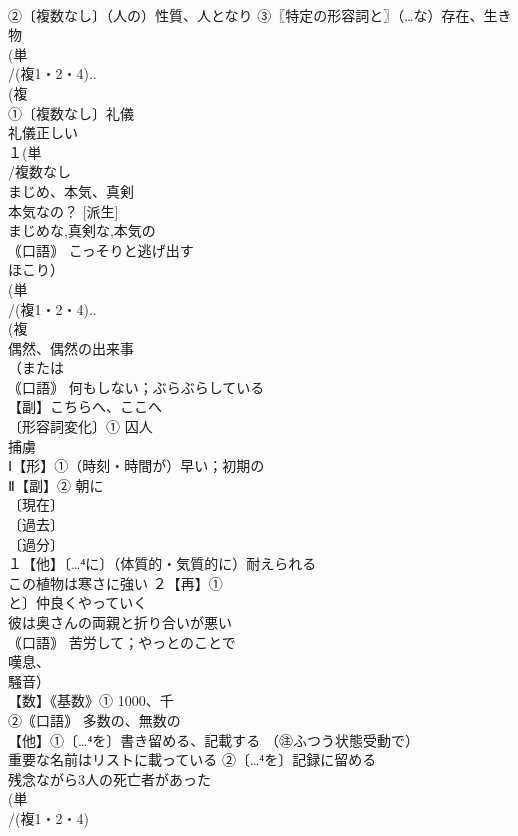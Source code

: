 \documentclass[8pt]{extreport}
\begin{document}
\begin{CJK}{UTF8}{min}
\\	②〔複数なし〕（人の）性質、人となり ③〖特定の形容詞と〗（…な）存在、生き物
\\	(単
\\	/(複1・2・4)..
\\	(複
\\	①〔複数なし〕礼儀 
\\	礼儀正しい
\\	１(単
\\	/複数なし 
\\	まじめ、本気、真剣 
\\	本気なの？ [派生] 
\\	まじめな,真剣な,本気の
\\	｟口語｠ こっそりと逃げ出す 
\\	ほこり）
\\	(単
\\	/(複1・2・4)..
\\	(複
\\	偶然、偶然の出来事 
\\	（または
\\	｟口語｠ 何もしない；ぶらぶらしている
\\	【副】こちらへ、ここへ 
\\	〔形容詞変化〕① 囚人 
\\	捕虜
\\	Ⅰ【形】①（時刻・時間が）早い；初期の 
\\	Ⅱ【副】② 朝に
\\	〔現在〕
\\	〔過去〕
\\	〔過分〕
\\	１【他】〔…⁴に〕（体質的・気質的に）耐えられる 
\\	この植物は寒さに強い ２【再】①
\\	と〕仲良くやっていく 
\\	彼は奥さんの両親と折り合いが悪い 
\\	｟口語｠ 苦労して；やっとのことで 
\\	嘆息、
\\	騒音）
\\	【数】《基数》① 1000、千 
\\	②｟口語｠ 多数の、無数の
\\	【他】①〔…⁴を〕書き留める、記載する （㊟ふつう状態受動で） 
\\	重要な名前はリストに載っている ②〔…⁴を〕記録に留める 
\\	残念ながら3人の死亡者があった
\\	(単
\\	/(複1・2・4)

\end{CJK}
\end{document}
